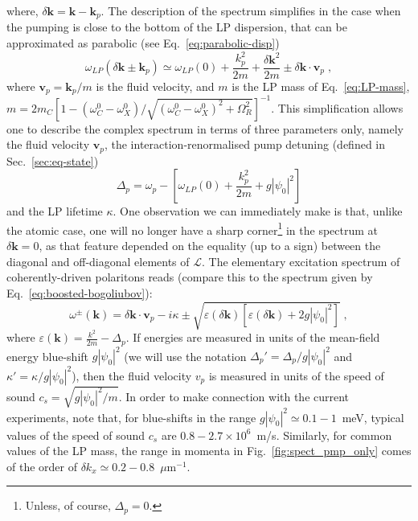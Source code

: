 %
where, $\delta \bm{k} = \bm{k} - \bm{k}_p$. The description of the
spectrum simplifies in the case when the pumping is close to the
bottom of the LP dispersion, that can be approximated as parabolic
(see Eq.~\eqref{eq:parabolic-disp})
%
\begin{equation}
  \omega_{LP} (\delta \bm{k} \pm \bm{k}_p) \simeq \omega_{LP}(0) +
  \frac{k_p^2}{2m} + \frac{\delta \bm{k}^2}{2m} \pm \delta \bm{k}
  \cdot \bm{v}_p \; ,
\end{equation}
%
where $\bm{v}_p=\bm{k}_p/m$ is the fluid velocity, and $m$ is the LP
mass of Eq.~\eqref{eq:LP-mass},
$m = 2m_C [1 - (\omega_C^0 - \omega_X^0)/\sqrt{(\omega_C^0 -
  \omega_X^0)^2 + \Omega_R^2}]^{-1}$. This simplification allows one
to describe the complex spectrum in terms of three parameters only,
namely the fluid velocity $\bm{v}_p$, the interaction-renormalised
pump detuning (defined in Sec.~\ref{sec:eq-state})
%
\begin{equation}
  \Delta_p = \omega_p - \left[\omega_{LP} (0) +\frac{k_p^2}{2m} +
    g|\psi_0|^2\right]
\end{equation}
%
and the LP lifetime $\kappa$. One observation we can immediately make
is that, unlike the atomic case, one will no longer have a sharp
corner\footnote{Unless, of course, $\Delta_p = 0$.}  in the spectrum
at $\delta \bm{k} = 0$, as that feature depended on the equality (up
to a sign) between the diagonal and off-diagonal elements of
$\mathcal{L}$.
%
The elementary excitation spectrum of coherently-driven polaritons
reads (compare this to the spectrum given by
Eq.~\eqref{eq:boosted-bogoliubov}):
%
\begin{equation}
  \omega^{\pm} (\bm{k}) = \delta \bm{k}\cdot \bm{v}_p - i\kappa
  \pm \sqrt{\varepsilon(\delta \bm{k}) \left[\varepsilon(\delta
      \bm{k}) + 2g|\psi_0|^2\right]} \; ,
\label{eq:spect}
\end{equation}
%
where $\varepsilon(\bm{k}) = \frac{k^2}{2m} - \Delta_p$. If energies
are measured in units of the mean-field energy blue-shift $g
|\psi_0|^2$ (we will use the notation $\Delta_p' =
\Delta_p/g|\psi_0|^2$ and $\kappa'= \kappa/g|\psi_0|^2$), then the
fluid velocity $v_p$ is measured in units of the speed of sound $c_s =
\sqrt{g|\psi_0|^2/m}$. In order to make connection with the current
experiments, note that, for blue-shifts in the range $g |\psi_0|^2
\simeq 0.1-1$~meV, typical values of the speed of sound $c_s$ are
$0.8-2.7\times 10^6$~m/s. Similarly, for common values of the LP mass,
the range in momenta in Fig.~\ref{fig:spect_pmp_only} comes of the order of
$\delta k_x \simeq 0.2-0.8$~$\mu$m${}^{-1}$.

